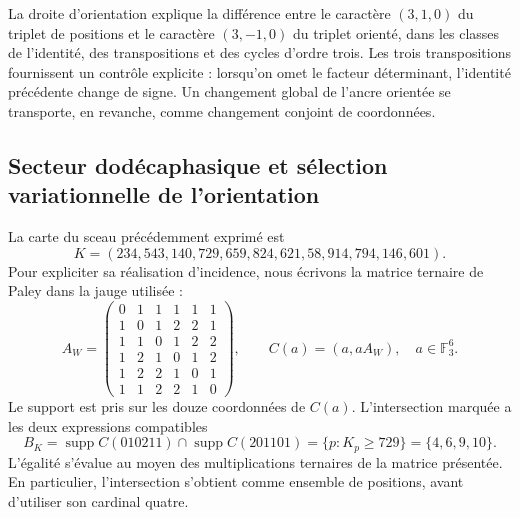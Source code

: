 La droite d’orientation explique la différence entre le caractère
\((3,1,0)\) du triplet de positions et le caractère \((3,-1,0)\)
du triplet orienté, dans les classes de l’identité, des transpositions et des cycles
d’ordre trois. Les trois transpositions fournissent un contrôle explicite :
lorsqu’on omet le facteur déterminant, l’identité précédente change de signe.
Un changement global de l’ancre orientée se transporte, en revanche, comme changement
conjoint de coordonnées.

\subsection{Secteur dodécaphasique et sélection variationnelle de l’orientation}

La carte du sceau précédemment exprimé est
\begin{equation}
 K=(234,543,140,729,659,824,621,58,914,794,146,601).
 \label{ii:eq:ii-witt-K-marked}
\end{equation}
Pour expliciter sa réalisation d’incidence, nous écrivons la matrice ternaire
de Paley dans la jauge utilisée :
\[
 A_W=\begin{pmatrix}
 0&1&1&1&1&1\\
 1&0&1&2&2&1\\
 1&1&0&1&2&2\\
 1&2&1&0&1&2\\
 1&2&2&1&0&1\\
 1&1&2&2&1&0
 \end{pmatrix},
 \qquad C(a)=(a,aA_W),\quad a\in\mathbb F_3^6.
\]
Le support est pris sur les douze coordonnées de \(C(a)\).
L’intersection marquée a les deux expressions compatibles
\begin{equation}
 B_K=\operatorname{supp}C(010211)\cap\operatorname{supp}C(201101)
     =\{p:K_p\ge729\}=\{4,6,9,10\}.
 \label{ii:eq:ii-witt-B-marked}
\end{equation}
L’égalité s’évalue au moyen des multiplications ternaires de la matrice
présentée. En particulier, l’intersection s’obtient comme ensemble de
positions, avant d’utiliser son cardinal quatre.

